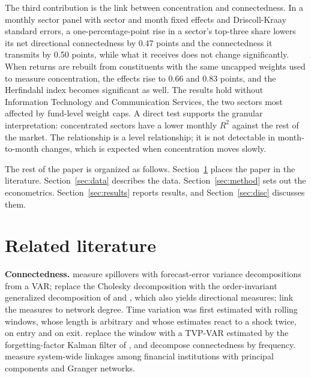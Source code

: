 \documentclass[11pt]{article}
\begin{document}
The third contribution is the link between concentration and connectedness. In a monthly sector panel with sector and month fixed effects and Driscoll-Kraay standard errors, a one-percentage-point rise in a sector's top-three share lowers its net directional connectedness by 0.47 points and the connectedness it transmits by 0.50 points, while what it receives does not change significantly. When returns are rebuilt from constituents with the same uncapped weights used to measure concentration, the effects rise to 0.66 and 0.83 points, and the Herfindahl index becomes significant as well. The results hold without Information Technology and Communication Services, the two sectors most affected by fund-level weight caps. A direct test supports the granular interpretation: concentrated sectors have a lower monthly $R^2$ against the rest of the market. The relationship is a level relationship; it is not detectable in month-to-month changes, which is expected when concentration moves slowly.

The rest of the paper is organized as follows. Section~\ref{sec:lit} places the paper in the literature. Section~\ref{sec:data} describes the data. Section~\ref{sec:method} sets out the econometrics. Section~\ref{sec:results} reports results, and Section~\ref{sec:disc} discusses them.

\section{Related literature}\label{sec:lit}

\textbf{Connectedness.} \citet{diebold2009} measure spillovers with forecast-error variance decompositions from a VAR; \citet{diebold2012} replace the Cholesky decomposition with the order-invariant generalized decomposition of \citet{koop1996} and \citet{pesaran1998}, which also yields directional measures; \citet{diebold2014} link the measures to network degree. Time variation was first estimated with rolling windows, whose length is arbitrary and whose estimates react to a shock twice, on entry and on exit. \citet{antonakakis2020} replace the window with a TVP-VAR estimated by the forgetting-factor Kalman filter of \citet{koop2013}, and \citet{barunik2018} decompose connectedness by frequency. \citet{billio2012} measure system-wide linkages among financial institutions with principal components and Granger networks.
\end{document}
